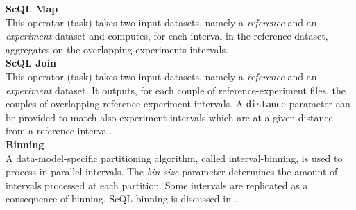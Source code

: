 \documentclass[a4paper, 10pt, conference]{ieeeconf}      %
\begin{document}
\noindent\textbf{ScQL Map}\\
This operator (task) takes two input datasets, namely a \textit{reference} and an \textit{experiment} dataset and computes, for each interval in the reference dataset, aggregates on the overlapping experiments intervals. \\

\noindent\textbf{ScQL Join}\\
This operator (task) takes two input datasets, namely a \textit{reference} and an \textit{experiment} dataset. It outputs, for each couple of reference-experiment files, the couples of overlapping reference-experiment intervals.  A \texttt{distance} parameter can be provided to match also experiment intervals which are at a given distance from a reference interval.  \\

\noindent\textbf{Binning}\\
A data-model-specific partitioning algorithm, called interval-binning, is used to process in parallel intervals. The \textit{bin-size} parameter determines the amount of intervals processed at each partition. Some intervals are replicated as a consequence of binning. ScQL binning is discussed in \cite{binning}.

\end{document}

